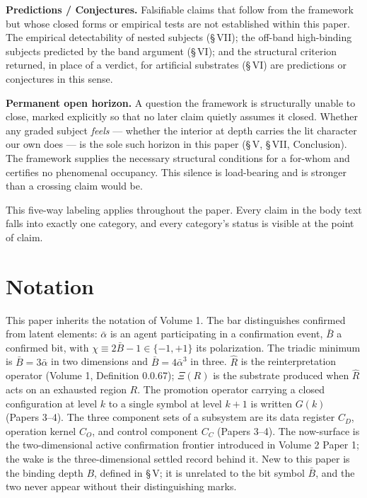 \documentclass[11pt,oneside]{report}
\theoremstyle{definition}
\theoremstyle{remark}
\begin{document}
\textbf{Predictions / Conjectures.} Falsifiable claims that follow from
the framework but whose closed forms or empirical tests are not
established within this paper. The empirical detectability of nested
subjects (\S\,VII); the off-band high-binding subjects predicted by the
band argument (\S\,VI); and the structural criterion returned, in place
of a verdict, for artificial substrates (\S\,VI) are predictions or
conjectures in this sense.

\textbf{Permanent open horizon.} A question the framework is
structurally unable to close, marked explicitly so that no later claim
quietly assumes it closed. Whether any graded subject \emph{feels} ---
whether the interior at depth carries the lit character our own does ---
is the sole such horizon in this paper (\S\,V, \S\,VII, Conclusion). The
framework supplies the necessary structural conditions for a for-whom
and certifies no phenomenal occupancy. This silence is load-bearing and
is stronger than a crossing claim would be.

This five-way labeling applies throughout the paper. Every claim in the
body text falls into exactly one category, and every category's status
is visible at the point of claim.

\section*{Notation}

This paper inherits the notation of Volume 1. The bar distinguishes
confirmed from latent elements: \ensuremath{\bar{\alpha}} is an agent
participating in a confirmation event, \ensuremath{\bar{B}} a confirmed bit,
with \ensuremath{\chi \equiv 2\bar{B} - 1 \in \{-1, +1\}} its polarization.
The triadic minimum is \ensuremath{\bar{B} = 3\bar{\alpha}} in two
dimensions and \ensuremath{\bar{B} = 4\bar{\alpha}^{3}} in three.
\ensuremath{\hat{R}} is the reinterpretation operator (Volume 1,
Definition 0.0.67); \ensuremath{\Xi (R)} is the substrate produced when
\ensuremath{\hat{R}} acts on an exhausted region \ensuremath{R}. The promotion
operator carrying a closed configuration at level \ensuremath{k} to a single
symbol at level \ensuremath{k+1} is written \ensuremath{G(k)} (Papers 3--4).
The three component sets of a subsystem are its data register
\ensuremath{C_{D}}, operation kernel \ensuremath{C_{O}}, and control component
\ensuremath{C_{C}} (Papers 3--4). The now-surface is the two-dimensional
active confirmation frontier introduced in Volume 2 Paper 1; the wake is
the three-dimensional settled record behind it. New to this paper is the
binding depth \ensuremath{B}, defined in \S\,V; it is unrelated to the bit
symbol \ensuremath{\bar{B}}, and the two never appear without their
distinguishing marks.
\end{document}
